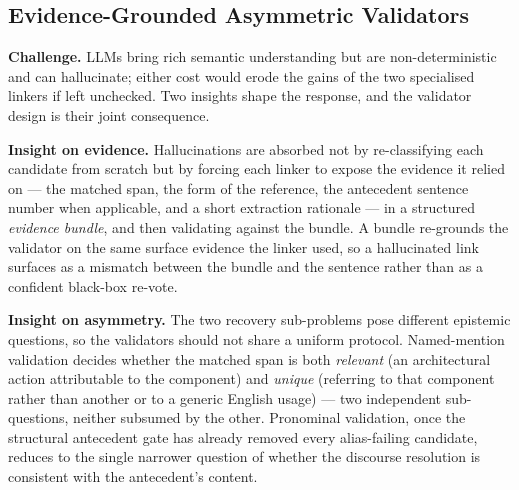 \subsection{Evidence-Grounded Asymmetric Validators}\label{sec:validators}

\textbf{Challenge.} \acp{LLM} bring rich semantic understanding but are non-deterministic and can hallucinate; either cost would erode the gains of the two specialised linkers if left unchecked.
Two insights shape the response, and the validator design is their joint consequence.

\textbf{Insight on evidence.} Hallucinations are absorbed not by re-classifying each candidate from scratch but by forcing each linker to expose the evidence it relied on --- the matched span, the form of the reference, the antecedent sentence number when applicable, and a short extraction rationale --- in a structured \emph{evidence bundle}, and then validating against the bundle.
A bundle re-grounds the validator on the same surface evidence the linker used, so a hallucinated link surfaces as a mismatch between the bundle and the sentence rather than as a confident black-box re-vote.

\textbf{Insight on asymmetry.} The two recovery sub-problems pose different epistemic questions, so the validators should not share a uniform protocol.
Named-mention validation decides whether the matched span is both \emph{relevant} (an architectural action attributable to the component) and \emph{unique} (referring to that component rather than another or to a generic English usage) --- two independent sub-questions, neither subsumed by the other.
Pronominal validation, once the structural antecedent gate has already removed every alias-failing candidate, reduces to the single narrower question of whether the discourse resolution is consistent with the antecedent's content.

